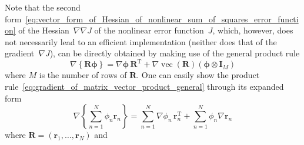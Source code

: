 \documentclass[12pt,a4paper]{article}
\begin{document}
Note that
the second form~\eqref{eq:vector_form_of_Hessian_of_nonlinear_sum_of_squares_error_function}
of the Hessian~$\nabla\nabla J$ of the nonlinear error function~$J$,
which, however, does not necessarily lead to an efficient implementation
(neither does that of the gradient~$\nabla J$),
can be directly obtained by making use of the general product rule
\begin{equation}
\nabla \left\{ \mathbf{R} \bm{\phi} \right\}
= \nabla \bm{\phi} \, \mathbf{R}^{\operatorname{T}}
+ \nabla \operatorname{vec}\left( \mathbf{R} \right)
\left( \bm{\phi} \otimes \mathbf{I}_M \right)
\label{eq:gradient_of_matrix_vector_product_general}
\end{equation}
where $M$ is the number of rows of $\mathbf{R}$.
One can easily show the product rule~\eqref{eq:gradient_of_matrix_vector_product_general}
through its expanded form
\begin{equation}
\nabla \left\{ \sum_{n=1}^{N} \phi_n \mathbf{r}_n \right\}
= \sum_{n=1}^{N} \nabla \phi_n \, \mathbf{r}_n^{\operatorname{T}}
+ \sum_{n=1}^{N} \phi_n \nabla \mathbf{r}_n
\label{eq:gradient_of_matrix_vector_product_general_expanded_form}
\end{equation}
where $\mathbf{R} = \left(\mathbf{r}_1, \dots, \mathbf{r}_N\right)$ and
\end{document}
